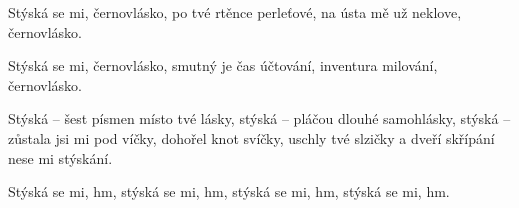 \beginverse{}
\chordsoff{}
Stýská se mi, černovlásko,
po tvé rtěnce perleťové,
na ústa mě už neklove, černovlásko.  
\chordson{}
\endverse{}

\beginverse{}
\chordsoff{}
Stýská se mi, černovlásko,
smutný je čas účtování,
inventura milování, černovlásko.  
\chordson{}
\endverse{}

\repeatingchorus{}
\beginchorus{}
\chordsoff{}
Stýská -- šest písmen místo tvé lásky,
stýská -- pláčou dlouhé samohlásky,
stýská -- zůstala jsi mi pod víčky,
dohořel knot svíčky, uschly tvé slzičky
a dveří skřípání nese mi stýskání.
\chordson{}
\endchorus{}

\beginverse*{}
Stýská se mi, hm,  stýská se mi, hm, 
stýská se mi, hm,  stýská se mi, hm. 
\endverse{}

\endsong{}
